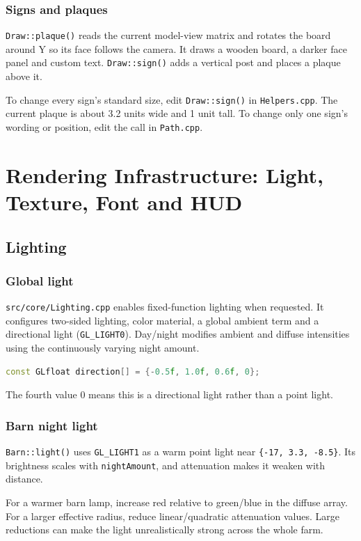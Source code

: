 \documentclass[11pt,a4paper,openany]{book}
\newcommand{\code}[1]{\texttt{#1}}
\newcommand{\file}[1]{\nolinkurl{#1}}
\begin{document}
\section{Signs and plaques}
\code{Draw::plaque()} reads the current model-view matrix and rotates the board around Y so its face follows the camera. It draws a wooden board, a darker face panel and custom text. \code{Draw::sign()} adds a vertical post and places a plaque above it.

\begin{editbox}
	To change every sign's standard size, edit \code{Draw::sign()} in \file{Helpers.cpp}. The current plaque is about 3.2 units wide and 1 unit tall. To change only one sign's wording or position, edit the call in \file{Path.cpp}.
\end{editbox}

\part{Rendering Infrastructure: Light, Texture, Font and HUD}

\chapter{Lighting}
\section{Global light}
\file{src/core/Lighting.cpp} enables fixed-function lighting when requested. It configures two-sided lighting, color material, a global ambient term and a directional light (\code{GL\_LIGHT0}). Day/night modifies ambient and diffuse intensities using the continuously varying night amount.

\begin{lstlisting}[language=C++]
const GLfloat direction[] = {-0.5f, 1.0f, 0.6f, 0};
\end{lstlisting}
The fourth value 0 means this is a directional light rather than a point light.

\section{Barn night light}
\code{Barn::light()} uses \code{GL\_LIGHT1} as a warm point light near \code{\{-17, 3.3, -8.5\}}. Its brightness scales with \code{nightAmount}, and attenuation makes it weaken with distance.

\begin{editbox}
	For a warmer barn lamp, increase red relative to green/blue in the diffuse array. For a larger effective radius, reduce linear/quadratic attenuation values. Large reductions can make the light unrealistically strong across the whole farm.
\end{editbox}
\end{document}
